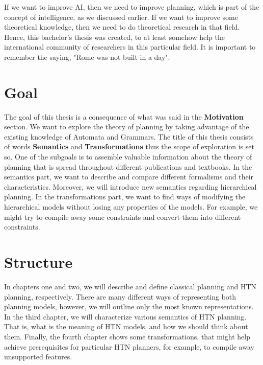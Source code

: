 \medskip\noindent
If we want to improve AI, then we need to improve planning, which is part of the concept of intelligence, as we discussed earlier. If we want to improve some theoretical knowledge, then we need to do theoretical research in that field. Hence, this bachelor's thesis was created, to at least somehow help the international community of researchers in this particular field. It is important to remember the saying, "Rome was not built in a day".

\section*{Goal}

\noindent
The goal of this thesis is a consequence of what was said in the \textbf{Motivation} section. We want to explore the theory of planning by taking advantage of the existing knowledge of Automata and Grammars. The title of this thesis consists of words \textbf{Semantics} and \textbf{Transformations} thus the scope of exploration is set so. One of the subgoals is to assemble valuable information about the theory of planning that is spread throughout different publications and textbooks. In the semantics part, we want to describe and compare different formalisms and their characteristics.
Moreover, we will introduce new semantics regarding hierarchical planning. In the transformations part, we want to find ways of modifying the hierarchical models without losing any properties of the models. For example, we might try to compile away some constraints and convert them into different constraints.

\section*{Structure}

\noindent
In chapters one and two, we will describe and define classical planning and HTN planning, respectively. There are many different ways of representing both planning models, however, we will outline only the most known representations. In the third chapter, we will characterize various semantics of HTN planning. That is, what is the meaning of HTN models, and how we should think about them. Finally, the fourth chapter shows some transformations, that might help achieve prerequisites for particular HTN planners, for example, to compile away unsupported features.